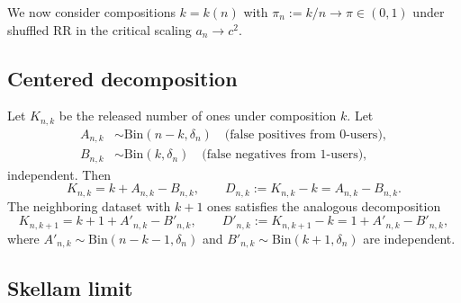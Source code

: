 \documentclass{article}
\begin{document}
We now consider compositions $k = k(n)$ with $\pi_n := k/n \to \pi \in (0, 1)$ under shuffled RR in the
critical scaling $a_n \to c^2$.

\subsection{Centered decomposition}

Let $K_{n,k}$ be the released number of ones under composition $k$. Let
\begin{align*}
A_{n,k} &\sim \mathrm{Bin}(n-k, \delta_n) \quad \text{(false positives from 0-users)},\\
B_{n,k} &\sim \mathrm{Bin}(k, \delta_n) \quad \text{(false negatives from 1-users)},
\end{align*}
independent. Then
\begin{equation}
K_{n,k} = k + A_{n,k} - B_{n,k}, \qquad D_{n,k} := K_{n,k} - k = A_{n,k} - B_{n,k}. \label{eq:Dnk}
\end{equation}
The neighboring dataset with $k+1$ ones satisfies the analogous decomposition
\begin{equation}
K_{n,k+1} = k + 1 + A'_{n,k} - B'_{n,k}, \qquad D'_{n,k} := K_{n,k+1} - k = 1 + A'_{n,k} - B'_{n,k}, \label{eq:Dnk_alt}
\end{equation}
where $A'_{n,k} \sim \mathrm{Bin}(n-k-1, \delta_n)$ and $B'_{n,k} \sim \mathrm{Bin}(k+1, \delta_n)$ are independent.

\subsection{Skellam limit}
\end{document}
